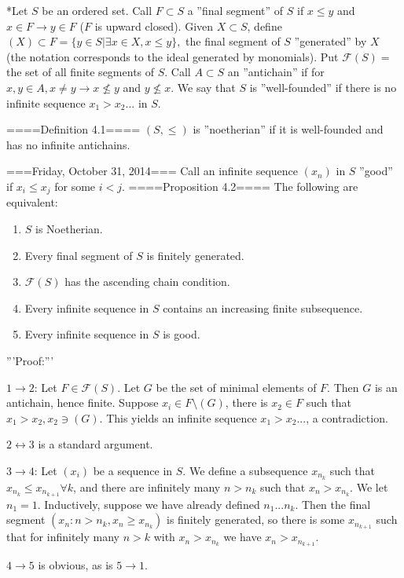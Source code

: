 *Let $S$ be an ordered set. Call $F \subset S$ a ''final segment'' of $S$ if $x \leq y$ and $x \in F \rightarrow y \in F$ ($F$ is upward closed). Given $X \subset S$, define $(X) \subset F = \{y \in S|\exists x \in X, x \leq y\},$ the final segment of $S$ ''generated'' by $X$ (the notation corresponds to the ideal generated by monomials). Put $\mathcal{F}(S)=$ the set of all finite segments of $S$. Call $A \subset S$ an ''antichain'' if for $x, y \in A, x \neq y \rightarrow x \not\leq y$ and $y \not\leq x$. We say that $S$ is ''well-founded'' if there is no infinite sequence $x_{1}>x_{2}...$ in $S$.

====Definition 4.1====
$(S, \leq)$ is ''noetherian'' if it is well-founded and has no infinite antichains.


===Friday, October 31, 2014===
Call an infinite sequence $(x_n)$ in $S$ ''good'' if $x_i \leq x_j$ for some $i<j$.
====Proposition 4.2====
The following are equivalent:
\begin{enumerate}
	\item  $S$ is Noetherian.
	\item  Every final segment of $S$ is finitely generated.
	\item  $\mathcal{F}(S)$ has the ascending chain condition.
	\item  Every infinite sequence in $S$ contains an increasing finite subsequence.
	\item  Every infinite sequence in $S$ is good.
\end{enumerate}

'''Proof:'''

$1 \rightarrow 2$: Let $F \in \mathcal{F}(S)$. Let $G$ be the set of minimal elements of $F$. Then $G$ is an antichain, hence finite. Suppose $x_i \in F \setminus (G)$, there is $x_2 \in F$ such that $x_1 > x_2, x_2 \ni (G)$. This yields an infinite sequence $x_1 > x_2...$, a contradiction.

$2 \leftrightarrow 3$ is a standard argument.

$3 \rightarrow 4$: Let $(x_i)$ be a sequence in $S$. We define a subsequence $x_{n_k}$ such that $x_{n_k} \leq x_{n_{k+1}} \forall k$, and there are infinitely many $n > n_k$ such that $x_n > x_{n_k}$. We let $n_1 = 1$. Inductively, suppose we have already defined $n_1...n_k$. Then the final segment $(x_n: n > n_k, x_n \geq x_{n_k})$ is finitely generated, so there is some $x_{n_{k+1}}$ such that for infinitely many $n>k$ with $x_n > x_{n_k}$ we have $x_n > x_{n_{k+1}}$.

$4 \rightarrow 5$ is obvious, as is $5 \rightarrow 1$.

